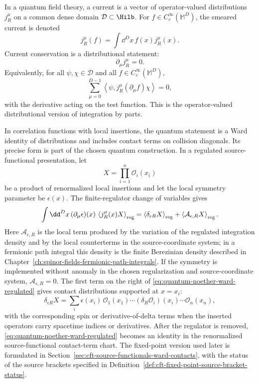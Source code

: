\begin{definition}
\label{def:quantum-current-operator-valued-distribution}
In a quantum field theory, a current is a vector of operator-valued
distributions \(j^\mu_R\) on a common dense domain
\(\mathcal D\subset\Hilb\).  For \(f\in C_c^\infty(\mathbb M^D)\), the
smeared current is denoted
\[
  j^\mu_R(f)=\int\dd^Dx\,f(x)j^\mu_R(x).
\]
Current conservation is a distributional statement:
\[
  \partial_\mu j_R^\mu=0.
\]
Equivalently, for all \(\psi,\chi\in\mathcal D\) and all
\(f\in C_c^\infty(\mathbb M^D)\),
\[
  \sum_{\mu=0}^{D-1}
  \left\langle\psi,j_R^\mu(\partial_\mu f)\chi\right\rangle=0,
\]
with the derivative acting on the test function.  This is the operator-valued
distributional version of integration by parts.
\end{definition}

\begin{definition}
\label{def:regulated-ward-identity-contact-terms}
In correlation functions with local insertions, the quantum statement is a
Ward identity of distributions and includes contact terms on collision
diagonals.  Its precise form is part of the chosen quantum construction.  In a
regulated source-functional presentation, let
\[
  X=\prod_{i=1}^n\mathcal O_i(x_i)
\]
be a product of renormalized local insertions and let the local symmetry
parameter be \(\epsilon(x)\).  The finite-regulator change of variables gives
\begin{equation}
  \int\dd^Dx\,(\partial_\mu\epsilon)(x)\,
  \left\langle j_R^\mu(x)X\right\rangle_{\rm reg}
  =
  \left\langle \delta_{\epsilon R}X\right\rangle_{\rm reg}
  +
  \left\langle \mathcal A_{\epsilon,R}X\right\rangle_{\rm reg}.
  \label{eq:quantum-noether-ward-regulated}
\end{equation}
Here \(\mathcal A_{\epsilon,R}\) is the local term produced by the variation
of the regulated integration density and by the local counterterms in the
source-coordinate system; in a fermionic path integral this density is the finite
Berezinian density described in
Chapter~\ref{ch:spinor-fields-fermionic-path-integrals}.  If the symmetry is
implemented without anomaly in the chosen regularization and source-coordinate system,
\(\mathcal A_{\epsilon,R}=0\).  The first term on the right of
\eqref{eq:quantum-noether-ward-regulated} gives contact distributions
supported at \(x=x_i\):
\[
  \delta_{\epsilon R}X
  =
  \sum_i
  \epsilon(x_i)\,
  \mathcal O_1(x_1)\cdots
  (\delta_R\mathcal O_i)(x_i)\cdots
  \mathcal O_n(x_n),
\]
with the corresponding spin or derivative-of-delta terms when the inserted
operators carry spacetime indices or derivatives.  After the regulator is
removed, \eqref{eq:quantum-noether-ward-regulated} becomes an identity in the
renormalized source-functional contact-term chart.  The fixed-point version
used later is formulated in
Section~\ref{sec:cft-source-functionals-ward-contacts}, with the status of
the source brackets specified in
Definition~\ref{def:cft-fixed-point-source-bracket-status}.
\end{definition}

